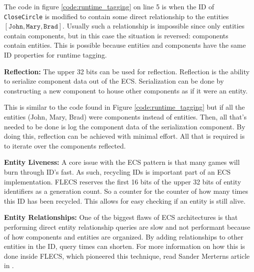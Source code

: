 The code in figure \ref{code:runtime_tagging} on line 5 is when the ID of \texttt{CloseCircle} is modified to contain some direct relationship to the entities $[\texttt{John}, \texttt{Mary}, \texttt{Brad}]$. Usually such a relationship is impossible since only entities contain components, but in this case the situation is reversed: components contain entities. This is possible because entities and components have the same ID properties for runtime tagging.

\textbf{Reflection:}
The upper 32 bits can be used for reflection. Reflection is the ability to serialize component data out of the ECS. Serialization can be done by constructing a new component to house other components as if it were an entity.

This is similar to the code found in Figure \ref{code:runtime_tagging} but if all the entities (John, Mary, Brad) were components instead of entities. Then, all that's needed to be done is log the component data of the serialization component. By doing this, reflection can be achieved with minimal effort. All that is required is to iterate over the components reflected.

\textbf{Entity Liveness:}
A core issue with the ECS pattern is that many games will burn through ID's fast. As such, recycling IDs is important part of an ECS implementation. FLECS reserves the first 16 bits of the upper 32 bits of entity identifiers as a generation count. So a counter for the counter of how many times this ID has been recycled. This allows for easy checking if an entity is still alive.  

\textbf{Entity Relationships:}
One of the biggest flaws of ECS architectures is that performing direct entity relationship queries are slow and not performant because of how components and entities are organized. By adding relationships to other entities in the ID, query times can shorten. For more information on how this is done inside FLECS, which pioneered this technique, read Sander Merterns article in \cite{SanderMertensEntityIDs}.

